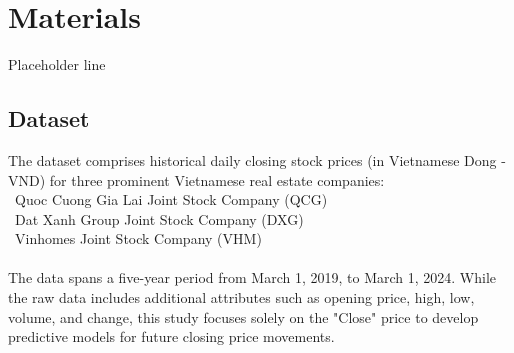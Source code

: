 \documentclass{ieeeojies}
\begin{document}
\section{Materials}
Placeholder line
\subsection{Dataset}

The dataset comprises historical daily closing stock prices (in Vietnamese Dong - VND) for three prominent Vietnamese real estate companies:
 \\
  \indent\textbullet\ Quoc Cuong Gia Lai Joint Stock Company (QCG) \\
  \indent\textbullet\ Dat Xanh Group Joint Stock Company (DXG) \\
  \indent\textbullet\ Vinhomes Joint Stock Company (VHM) \\
  \\
The data spans a five-year period from March 1, 2019, to March 1, 2024.  While the raw data includes additional attributes such as opening price, high, low, volume, and change, this study focuses solely on the "Close" price to develop predictive models for future closing price movements.
\end{document}
